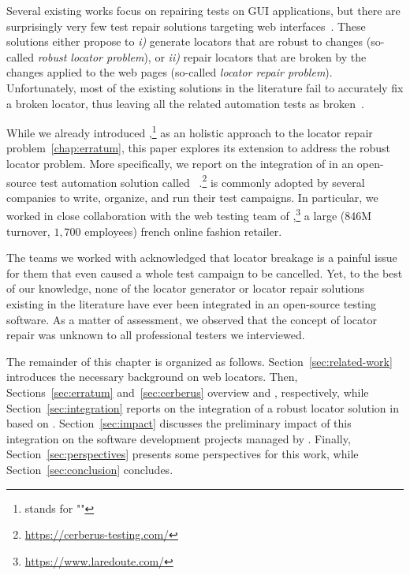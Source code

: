 Several existing works focus on repairing tests on GUI applications, but there are surprisingly very few test repair solutions targeting web interfaces~\cite{imtiaz2019systematic}.
These solutions either propose to \emph{i)} generate locators that are robust to changes (so-called \emph{robust locator problem}), or \emph{ii)} repair locators that are broken by the changes applied to the web pages (so-called \emph{locator repair problem}).
Unfortunately, most of the existing solutions in the literature fail to accurately fix a broken locator, thus leaving all the related automation tests as broken~\cite{hammoudi2016record}.

While we already introduced \erratum{},\footnote{\erratum{} stands for "\erratumlong{}"} as an holistic approach to the locator repair problem~\ref{chap:erratum}, this         paper explores its extension to address the robust locator problem.
More specifically, we report on the integration of \erratum{} in an open-source test automation solution called \cerberus{}~\cite{cerberus-icst20}.\footnote{\url{https://cerberus-testing.com/}}
\cerberus{} is commonly adopted by several companies to write, organize, and run their test campaigns.
In particular, we worked in close collaboration with the web testing team of \laredoute{},\footnote{\url{https://www.laredoute.com/}} a large (846M turnover, $1,700$ employees) french online fashion retailer.

The teams we worked with acknowledged that locator breakage is a painful issue for them that even caused a whole test campaign to be cancelled.
Yet, to the best of our knowledge, none of the locator generator or locator repair solutions existing in the literature have ever been integrated in an open-source testing software.
As a matter of assessment, we observed that the concept of locator repair was unknown to all professional testers we interviewed.


The remainder of this chapter is organized as follows.
Section~\ref{sec:related-work} introduces the necessary background on web locators.
% 
Then, Sections~\ref{sec:erratum} and~\ref{sec:cerberus} overview \erratum and \cerberus, respectively, while Section~\ref{sec:integration} reports on the integration of a robust locator solution in \cerberus based on \erratum.
Section~\ref{sec:impact} discusses the preliminary impact of this integration on the software development projects managed by \laredoute.
% 
Finally, Section~\ref{sec:perspectives} presents some perspectives for this work, while Section~\ref{sec:conclusion} concludes.

